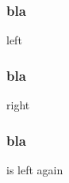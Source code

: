 \documentclass{beamer}
\begin{document}
\begin{frame}
    \frametitle{bla}
  left
\end{frame} 

\begin{frame}[imagetitle]
    \frametitle{bla}
  right
\end{frame}

\begin{frame}
    \frametitle{bla}
  is left again
\end{frame}
\end{document}
